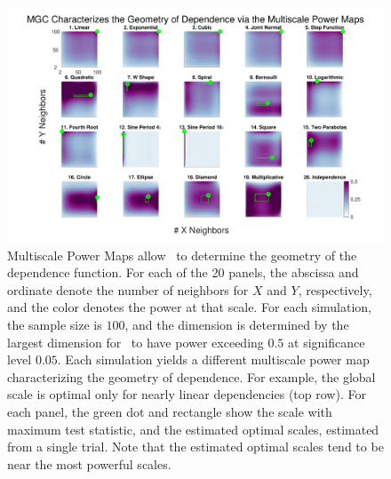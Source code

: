 \documentclass[11pt]{article}
\begin{document}
\begin{figure}[!ht]
\includegraphics[width=1.0\textwidth,trim={3cm 0.5cm 2.3cm 0.5cm},clip]{Figures/FigHDHeat}
\caption{Multiscale Power Maps allow \Mgc~to determine the geometry of the dependence function.
For each of the 20 panels, the abscissa and ordinate denote the number of neighbors for $X$ and  $Y$, respectively, and the color denotes the power at that scale. For each simulation, the sample size is $100$,  and the dimension is determined by the largest dimension for \Mgc~to have power exceeding $0.5$ at significance level $0.05$. Each simulation yields a different multiscale power map characterizing the geometry of dependence. 
For example, the global scale is optimal only for nearly linear dependencies (top row). 
For each panel, the green dot and rectangle show the scale with maximum test statistic,  and the estimated optimal scales, estimated from a single trial. Note that the estimated optimal scales tend to be near the most powerful scales.
}
\label{f:powermaps}
\end{figure}
\end{document}
